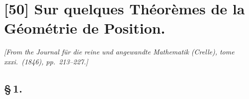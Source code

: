 \documentclass[12pt,a4paper]{article}
\begin{document}
\newpage

\section*{[50] Sur quelques Th\'eor\`emes de la G\'eom\'etrie de Position.}

\textit{[From the Journal f\"ur die reine und angewandte Mathematik (Crelle), tome xxxi.~(1846), pp.~213--227.]}

\bigskip

\subsection*{\S\,1.}
\end{document}
